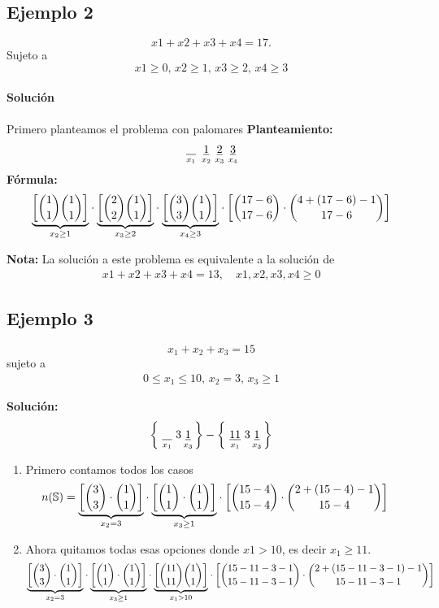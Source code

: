 \subsection*{Ejemplo 2}

$$x1+x2+x3+x4=17.$$
Sujeto a $$x1\geq0,\,x2\geq1,\,x3\geq2,\,x4\geq3$$

\paragraph{Solución} Primero planteamos el problema con palomares
\textbf{Planteamiento:}
\begin{align*}
\underset{x_1}{~\underline{\hspace{0.3cm}}~}
\underset{x_2}{~\underline{1}~}
\underset{x_3}{~\underline{2}~}
\underset{x_4}{~\underline{3}~}
\end{align*}
\textbf{Fórmula:}
\begin{align*}
\underset{x_2\geq1}{\underbrace{\left[\binom{1}{1}\binom{1}{1}\right]}}\cdot\underset{x_3\geq2}{\underbrace{\left[\binom{2}{2}\binom{1}{1}\right]}}\cdot\underset{x_4\geq3}{\underbrace{\left[\binom{3}{3}\binom{1}{1}\right]}}\cdot\left[\binom{17-6}{17-6}\cdot\binom{4+(17-6)-1}{17-6}\right]
\end{align*}

\textbf{Nota:}
La solución a este problema es equivalente a la solución de
\begin{align*}
x1+x2+x3+x4=13,\quad x1,x2,x3,x4\geq0
\end{align*}

\subsection*{Ejemplo 3}
\begin{equation*}
x_1+x_2+x_3=15
\end{equation*}
sujeto a 
\begin{align*}
0\leq x_1\leq10,\,x_2=3,\,x_3\geq1
\end{align*}

\textbf{Solución:}
\begin{equation*}
\left\{\underset{x_1}{~\underline{\hspace{0.3cm}}~} 3 \underset{x_3}{~\underline{1}~}\right\} -
\left\{\underset{x_1}{~\underline{11}~} 3 \underset{x_3}{~\underline{1}~}\right\}
\end{equation*}
\begin{enumerate}
\item Primero contamos todos los casos
\begin{align*}
n(\mathbb{S})&=\underset{x_2=3}{\underbrace{\left[\binom{3}{3}\cdot\binom{1}{1}\right]}}\cdot\underset{x_3\geq1}{\underbrace{\left[\binom{1}{1}\cdot\binom{1}{1}\right]}}\cdot\left[\binom{15-4}{15-4}\cdot\binom{2+(15-4)-1}{15-4}\right]
\end{align*}

\item Ahora quitamos todas esas opciones donde $x1>10$, es decir $x_1\geq11$.
\begin{align*}
\underset{x_2=3}{\underbrace{\left[\binom{3}{3}\cdot\binom{1}{1}\right]}}\cdot\underset{x_3\geq1}{\underbrace{\left[\binom{1}{1}\cdot\binom{1}{1}\right]}}\cdot\underset{x_1>10}{\underbrace{\left[\binom{11}{11}\binom{1}{1}\right]}}\cdot\left[\binom{15-11-3-1}{15-11-3-1}\cdot\binom{2+(15-11-3-1)-1}{15-11-3-1}\right]
\end{align*}
\end{enumerate}

